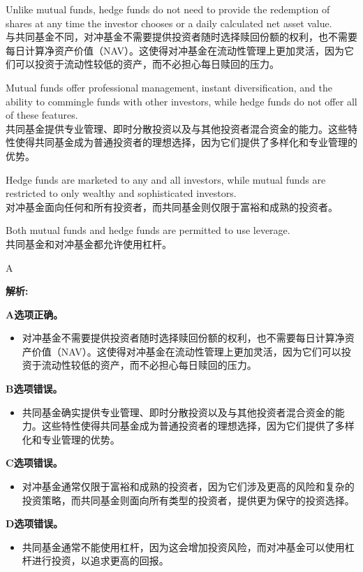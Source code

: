 \documentclass{article}
\newenvironment{explanation}
{\textbf{解析:}\par}
{\par}
\begin{document}
\begin{choices}
    \item Unlike mutual funds, hedge funds do not need to provide the redemption of shares at any time the investor chooses or a daily calculated net asset value.\\
    与共同基金不同，对冲基金不需要提供投资者随时选择赎回份额的权利，也不需要每日计算净资产价值（NAV）。这使得对冲基金在流动性管理上更加灵活，因为它们可以投资于流动性较低的资产，而不必担心每日赎回的压力。
    \item Mutual funds offer professional management, instant diversification, and the ability to commingle funds with other investors, while hedge funds do not offer all of these features.\\
    共同基金提供专业管理、即时分散投资以及与其他投资者混合资金的能力。这些特性使得共同基金成为普通投资者的理想选择，因为它们提供了多样化和专业管理的优势。
    \item Hedge funds are marketed to any and all investors, while mutual funds are restricted to only wealthy and sophisticated investors.\\
    对冲基金面向任何和所有投资者，而共同基金则仅限于富裕和成熟的投资者。
    \item Both mutual funds and hedge funds are permitted to use leverage.\\
    共同基金和对冲基金都允许使用杠杆。
\end{choices}

\begin{correctanswer}
    A
\end{correctanswer}

\begin{explanation}
    \textbf{A选项正确。}
    \begin{itemize}
        \item 对冲基金不需要提供投资者随时选择赎回份额的权利，也不需要每日计算净资产价值（NAV）。这使得对冲基金在流动性管理上更加灵活，因为它们可以投资于流动性较低的资产，而不必担心每日赎回的压力。
    \end{itemize}

    \textbf{B选项错误。}
    \begin{itemize}
        \item 共同基金确实提供专业管理、即时分散投资以及与其他投资者混合资金的能力。这些特性使得共同基金成为普通投资者的理想选择，因为它们提供了多样化和专业管理的优势。
    \end{itemize}

    \textbf{C选项错误。}
    \begin{itemize}
        \item 对冲基金通常仅限于富裕和成熟的投资者，因为它们涉及更高的风险和复杂的投资策略，而共同基金则面向所有类型的投资者，提供更为保守的投资选择。
    \end{itemize}

    \textbf{D选项错误。}
    \begin{itemize}
        \item 共同基金通常不能使用杠杆，因为这会增加投资风险，而对冲基金可以使用杠杆进行投资，以追求更高的回报。
    \end{itemize}
\end{explanation}
\end{document}
